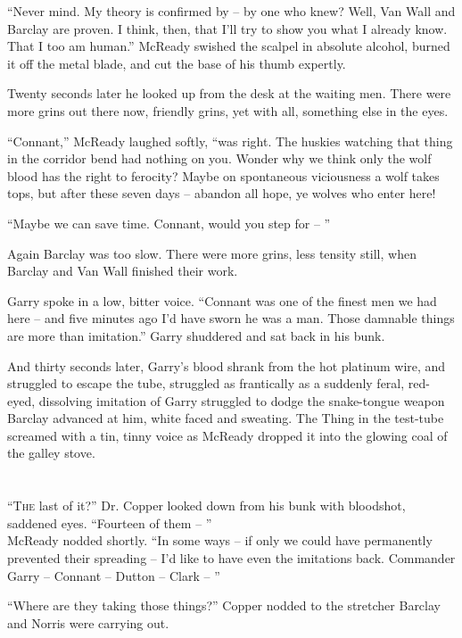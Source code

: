 \documentclass[ebook,oneside,11pt]{memoir}				%
\begin{document}
``Never mind. My theory is confirmed by -- by one who knew? Well, Van Wall and Barclay are proven. I think, then, that I'll try to show you what I already know. That I too am human.'' McReady swished the scalpel in absolute alcohol, burned it off the metal blade, and cut the base of his thumb expertly.

Twenty seconds later he looked up from the desk at the waiting men. There were more grins out there now, friendly grins, yet with all, something else in the eyes.

``Connant,'' McReady laughed softly, ``was right. The huskies watching that thing in the corridor bend had nothing on you. Wonder why we think only the wolf blood has the right to ferocity? Maybe on spontaneous viciousness a wolf takes tops, but after these seven days -- abandon all hope, ye wolves who enter here!

``Maybe we can save time. Connant, would you step for -- ''

Again Barclay was too slow. There were more grins, less tensity still, when Barclay and Van Wall finished their work.

Garry spoke in a low, bitter voice. ``Connant was one of the finest men we had here -- and five minutes ago I'd have sworn he was a man. Those damnable things are more than imitation.'' Garry shuddered and sat back in his bunk.

And thirty seconds later, Garry's blood shrank from the hot platinum wire, and struggled to escape the tube, struggled as frantically as a suddenly feral, red-eyed, dissolving imitation of Garry struggled to dodge the snake-tongue weapon Barclay advanced at him, white faced and sweating. The Thing in the test-tube screamed with a tin, tinny voice as McReady dropped it into the glowing coal of the galley stove. 

\chapter[Chapter 12]{}
\lettrine[lines=3,findent=3pt,nindent=2pt]{``T}{he} last of it?'' Dr. Copper looked down from his bunk with bloodshot, saddened eyes. ``Fourteen of them -- ''\\

McReady nodded shortly. ``In some ways -- if only we could have permanently prevented their spreading -- I'd like to have even the imitations back. Commander Garry -- Connant -- Dutton -- Clark -- ''

``Where are they taking those things?'' Copper nodded to the stretcher Barclay and Norris were carrying out.
\end{document}
